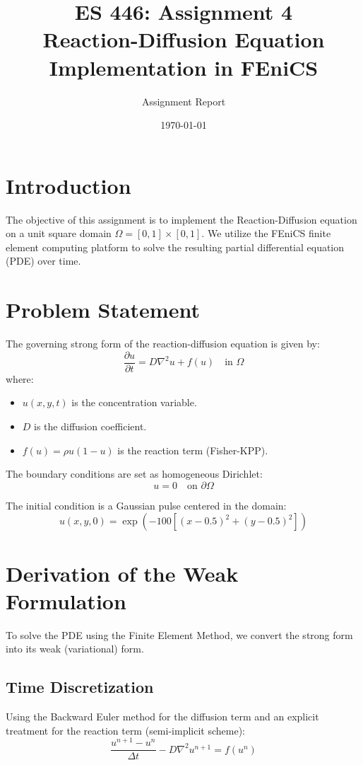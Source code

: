 \documentclass[a4paper,12pt]{article}
\title{ES 446: Assignment 4 \\ \large Reaction-Diffusion Equation Implementation in FEniCS}
\author{Assignment Report}
\date{\today}
\begin{document}
\maketitle

\section{Introduction}
The objective of this assignment is to implement the Reaction-Diffusion equation on a unit square domain $\Omega = [0, 1] \times [0, 1]$. We utilize the FEniCS finite element computing platform to solve the resulting partial differential equation (PDE) over time.

\section{Problem Statement}
The governing strong form of the reaction-diffusion equation is given by:
\begin{equation}
    \frac{\partial u}{\partial t} = D \nabla^2 u + f(u) \quad \text{in } \Omega
\end{equation}
where:
\begin{itemize}
    \item $u(x, y, t)$ is the concentration variable.
    \item $D$ is the diffusion coefficient.
    \item $f(u) = \rho u(1 - u)$ is the reaction term (Fisher-KPP).
\end{itemize}

The boundary conditions are set as homogeneous Dirichlet:
\begin{equation}
    u = 0 \quad \text{on } \partial\Omega
\end{equation}

The initial condition is a Gaussian pulse centered in the domain:
\begin{equation}
    u(x, y, 0) = \exp\left(-100 \left[(x-0.5)^2 + (y-0.5)^2\right]\right)
\end{equation}

\section{Derivation of the Weak Formulation}
To solve the PDE using the Finite Element Method, we convert the strong form into its weak (variational) form.

\subsection{Time Discretization}
Using the Backward Euler method for the diffusion term and an explicit treatment for the reaction term (semi-implicit scheme):
\begin{equation}
    \frac{u^{n+1} - u^n}{\Delta t} - D \nabla^2 u^{n+1} = f(u^n)
\end{equation}
\end{document}
